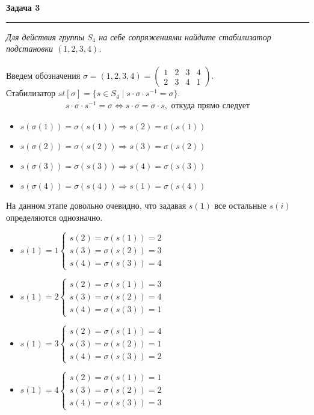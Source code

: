 \documentclass[a4paper,11pt]{article}
\begin{document}
\textbf{\large Задача 3}
\medskip\hrule\medskip
\textit{Для действия группы $ S_4 $ на себе сопряжениями найдите стабилизатор подстановки $ (1, 2, 3, 4) $.} \\ \\
Введем обозначения $ \sigma = (1, 2, 3, 4) = \begin{pmatrix} 1 & 2 & 3 & 4 \\[2pt]
 2 & 3 & 4 & 1\end{pmatrix} $. \\[2pt]
Стабилизатор $ st[\sigma] = \{s \in S_4 \; | \; s \cdot \sigma \cdot s^{-1} = \sigma \}$.
\begin{gather*}
s \cdot \sigma \cdot s^{-1} = \sigma \Longleftrightarrow s \cdot \sigma = \sigma \cdot s, \text{ откуда прямо следует} 
\end{gather*}
\begin{itemize}
	\item $ s(\sigma(1)) = \sigma(s(1)) \Rightarrow s(2) = \sigma(s(1))$
	\item $ s(\sigma(2)) = \sigma(s(2)) \Rightarrow s(3) = \sigma(s(2))$
	\item $ s(\sigma(3)) = \sigma(s(3)) \Rightarrow s(4) = \sigma(s(3))$
	\item $ s(\sigma(4)) = \sigma(s(4)) \Rightarrow s(1) = \sigma(s(4))$
\end{itemize}
На данном этапе довольно очевидно, что задавая $ s(1) $ все остальные $ s(i) $ определяются однозначно. 
\begin{itemize}
	\item $ s(1) = 1 
	\begin{cases}
		s(2) = \sigma(s(1)) = 2 \\[2pt]
		s(3) = \sigma(s(2)) = 3 \\[2pt]
		s(4) = \sigma(s(3)) = 4
	\end{cases} $
	\item $ s(1) = 2 
	\begin{cases}
		s(2) = \sigma(s(1)) = 3 \\[2pt]
		s(3) = \sigma(s(2)) = 4 \\[2pt]
		s(4) = \sigma(s(3)) = 1
	\end{cases} $
	\item $ s(1) = 3
	\begin{cases}
		s(2) = \sigma(s(1)) = 4 \\[2pt]
		s(3) = \sigma(s(2)) = 1 \\[2pt]
		s(4) = \sigma(s(3)) = 2
	\end{cases} $
	\item $ s(1) = 4 
	\begin{cases}
		s(2) = \sigma(s(1)) = 1 \\[2pt]
		s(3) = \sigma(s(2)) = 2 \\[2pt]
		s(4) = \sigma(s(3)) = 3
	\end{cases} $
\end{itemize}
\end{document}
